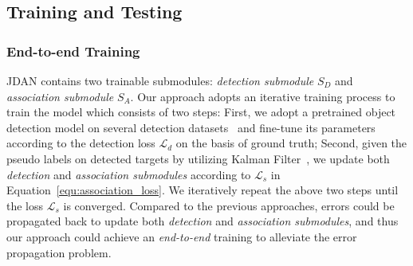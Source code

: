 \documentclass[acmsmall]{acmart}
\begin{document}
\subsection{Training and Testing}

\subsubsection{{End-to-end Training}} \label{sec:two_stage}
JDAN contains two trainable submodules: \emph{detection submodule} $S_D$ and \emph{association submodule} $S_A$.
{
Our approach adopts an iterative training process to train the model which consists of two steps:
First, we adopt a pretrained object detection model on several detection datasets~\cite{zhang2017citypersons,ess2008mobile,xiao2017joint,dollar2009pedestrian,zheng2017person} and fine-tune its parameters according to the detection loss $\mathcal{L}_{d}$ on the basis of ground truth; 
Second, given the pseudo labels on detected targets by utilizing Kalman Filter~\cite{welch1995introduction}, 
we update both \emph{detection} and \emph{association submodules} according to $\mathcal{L}_{s}$ in Equation~\ref{equ:association_loss}.
We iteratively repeat the above two steps until the loss $\mathcal{L}_{s}$ is converged.
Compared to the previous approaches, errors could be propagated back to update both \emph{detection} and \emph{association submodules},
and thus our approach could achieve an \emph{end-to-end} training to alleviate the error propagation problem.
}
\end{document}
